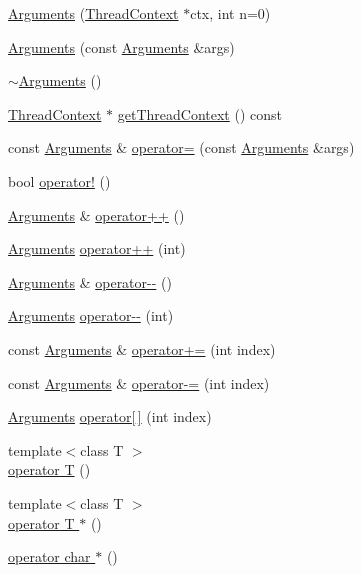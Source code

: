 \begin{DoxyCompactItemize}
\item 
\hyperlink{classArguments_a55f2456ddc19c77f4a61be8f602eaa49}{Arguments} (\hyperlink{classThreadContext}{ThreadContext} $\ast$ctx, int n=0)
\item 
\hyperlink{classArguments_a0eea816ed3db85f5b50b6d378dd1ace0}{Arguments} (const \hyperlink{classArguments}{Arguments} \&args)
\item 
\hyperlink{classArguments_a9a08f8f7637c56dac7715c06a8470a1f}{$\sim$Arguments} ()
\item 
\hyperlink{classThreadContext}{ThreadContext} $\ast$ \hyperlink{classArguments_a9010d7ea2c6add6308ebc3e34917ff00}{getThreadContext} () const 
\item 
const \hyperlink{classArguments}{Arguments} \& \hyperlink{classArguments_ae286709bbff703528eab0c4d4ce745c1}{operator=} (const \hyperlink{classArguments}{Arguments} \&args)
\item 
bool \hyperlink{classArguments_acc67790b71a4b793f60cb9b4c56e7355}{operator!} ()
\item 
\hyperlink{classArguments}{Arguments} \& \hyperlink{classArguments_aad546de7e6f8d7dd08ef30ff0d636c5b}{operator++} ()
\item 
\hyperlink{classArguments}{Arguments} \hyperlink{classArguments_a89b47778ded0b48b91cb2025d36d8068}{operator++} (int)
\item 
\hyperlink{classArguments}{Arguments} \& \hyperlink{classArguments_a13cd604ebb2ebefe1bb500cc9d88e5b8}{operator-\/-\/} ()
\item 
\hyperlink{classArguments}{Arguments} \hyperlink{classArguments_a48c3f69cad8d94dfd870884c988e1c38}{operator-\/-\/} (int)
\item 
const \hyperlink{classArguments}{Arguments} \& \hyperlink{classArguments_af0541e490df70f1796521b3b8eaf28d3}{operator+=} (int index)
\item 
const \hyperlink{classArguments}{Arguments} \& \hyperlink{classArguments_a55202bb4daa309e3bdf0d4f488f0b61b}{operator-\/=} (int index)
\item 
\hyperlink{classArguments}{Arguments} \hyperlink{classArguments_a008beadd17c801428c1c7cd90ce1ce49}{operator\mbox{[}$\,$\mbox{]}} (int index)
\item 
{\footnotesize template$<$class T $>$ }\\\hyperlink{classArguments_a4b15b6419d4ff99730ee9df795b90f61}{operator T} ()
\item 
{\footnotesize template$<$class T $>$ }\\\hyperlink{classArguments_a4e20322854ce5d78776cdaf1a87aacd9}{operator T $\ast$} ()
\item 
\hyperlink{classArguments_a2c2bebb89803c6d54e0fe24f41f24924}{operator char $\ast$} ()
\end{DoxyCompactItemize}

